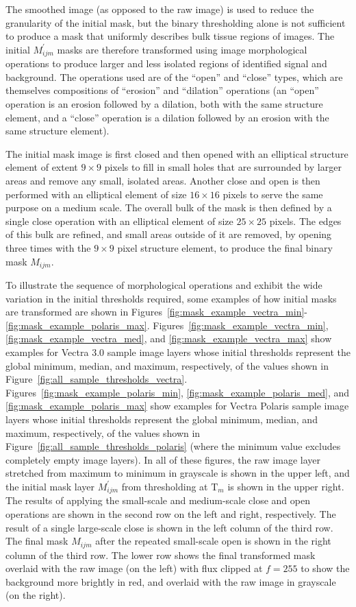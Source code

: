 \documentclass[letterpaper,11pt]{article}
\newcommand{\reffig}[1]{Figure~\ref{#1}}
\newcommand{\Tau}{\mathrm{T}}
\begin{document}
The smoothed image (as opposed to the raw image) is used to reduce the granularity of the initial mask, but the binary thresholding alone is not sufficient to produce a mask that uniformly describes bulk tissue regions of images. The initial $M^{\prime}_{ijm}$ masks are therefore transformed using image morphological operations \cite{opencv_mt} to produce larger and less isolated regions of identified signal and background. The operations used are of the ``open'' and ``close'' types, which are themselves compositions of ``erosion'' and ``dilation'' operations (an ``open'' operation is an erosion followed by a dilation, both with the same structure element, and a ``close'' operation is a dilation followed by an erosion with the same structure element).

The initial mask image is first closed and then opened with an elliptical structure element of extent $9 \times 9$ pixels to fill in small holes that are surrounded by larger areas and remove any small, isolated areas. Another close and open is then performed with an elliptical element of size $16 \times 16$ pixels to serve the same purpose on a medium scale. The overall bulk of the mask is then defined by a single close operation with an elliptical element of size $25 \times 25$ pixels. The edges of this bulk are refined, and small areas outside of it are removed, by opening three times with the $9 \times 9$ pixel structure element, to produce the final binary mask $M_{ijm}$.

To illustrate the sequence of morphological operations and exhibit the wide variation in the initial thresholds required, some examples of how initial masks are transformed are shown in Figures~\ref{fig:mask_example_vectra_min}-\ref{fig:mask_example_polaris_max}. Figures~\ref{fig:mask_example_vectra_min}, \ref{fig:mask_example_vectra_med}, and \ref{fig:mask_example_vectra_max} show examples for Vectra 3.0 sample image layers whose initial thresholds represent the global minimum, median, and maximum, respectively, of the values shown in \reffig{fig:all_sample_thresholds_vectra}. Figures~\ref{fig:mask_example_polaris_min}, \ref{fig:mask_example_polaris_med}, and \ref{fig:mask_example_polaris_max} show examples for Vectra Polaris sample image layers whose initial thresholds represent the global minimum, median, and maximum, respectively, of the values shown in \reffig{fig:all_sample_thresholds_polaris} (where the minimum value excludes completely empty image layers). In all of these figures, the raw image layer stretched from maximum to minimum in grayscale is shown in the upper left, and the initial mask layer $M^{\prime}_{ijm}$ from thresholding at $\Tau_{m}$ is shown in the upper right. The results of applying the small-scale and medium-scale close and open operations are shown in the second row on the left and right, respectively. The result of a single large-scale close is shown in the left column of the third row. The final mask $M_{ijm}$ after the repeated small-scale open is shown in the right column of the third row. The lower row shows the final transformed mask overlaid with the raw image (on the left) with flux clipped at $f=255$ to show the background more brightly in red, and overlaid with the raw image in grayscale (on the right).
\end{document}
